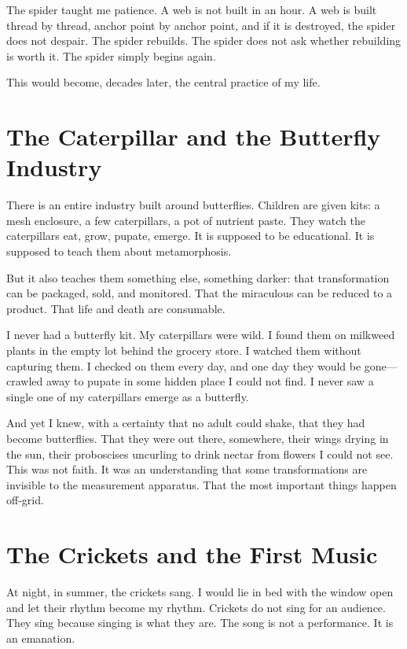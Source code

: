 \documentclass[11pt,openany]{book}
\begin{document}
The spider taught me patience. A web is not built in an hour. A web is built thread by thread, anchor point by anchor point, and if it is destroyed, the spider does not despair. The spider rebuilds. The spider does not ask whether rebuilding is worth it. The spider simply begins again.

This would become, decades later, the central practice of my life.

\section*{The Caterpillar and the Butterfly Industry}

There is an entire industry built around butterflies. Children are given kits: a mesh enclosure, a few caterpillars, a pot of nutrient paste. They watch the caterpillars eat, grow, pupate, emerge. It is supposed to be educational. It is supposed to teach them about metamorphosis.

But it also teaches them something else, something darker: that transformation can be packaged, sold, and monitored. That the miraculous can be reduced to a product. That life and death are consumable.

I never had a butterfly kit. My caterpillars were wild. I found them on milkweed plants in the empty lot behind the grocery store. I watched them without capturing them. I checked on them every day, and one day they would be gone---crawled away to pupate in some hidden place I could not find. I never saw a single one of my caterpillars emerge as a butterfly.

And yet I knew, with a certainty that no adult could shake, that they had become butterflies. That they were out there, somewhere, their wings drying in the sun, their proboscises uncurling to drink nectar from flowers I could not see. This was not faith. It was an understanding that some transformations are invisible to the measurement apparatus. That the most important things happen off-grid.

\section*{The Crickets and the First Music}

At night, in summer, the crickets sang. I would lie in bed with the window open and let their rhythm become my rhythm. Crickets do not sing for an audience. They sing because singing is what they are. The song is not a performance. It is an emanation.
\end{document}

